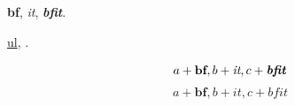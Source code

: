 \documentclass{article}
\begin{document}
\textbf{bf}, \textit{it}, \textbf{\textit{bfit}}.

\underline{ul}, .


\[ a+\textbf{bf}, b+\textit{it}, c+\textbf{\textit{bfit}} \]
\[ a+\mathbf{bf}, b+\mathit{it}, c+\mathbf{\mathit{bfit}} \]
\end{document}
